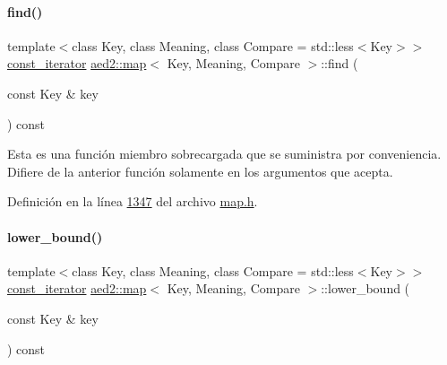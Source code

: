 \mbox{\label{classaed2_1_1map_adbf6f4ce01a16ca506e3c75fc2843882_adbf6f4ce01a16ca506e3c75fc2843882}} 
\paragraph{\texorpdfstring{find()}{find()}\hspace{0.1cm}{\footnotesize\ttfamily [2/2]}}
{\footnotesize\ttfamily template$<$class Key, class Meaning, class Compare = std\+::less$<$\+Key$>$$>$ \\
\hyperlink{classaed2_1_1map_1_1const__iterator}{const\+\_\+iterator} \hyperlink{classaed2_1_1map}{aed2\+::map}$<$ Key, Meaning, Compare $>$\+::find (\begin{DoxyParamCaption}\item[{const Key \&}]{key }\end{DoxyParamCaption}) const\hspace{0.3cm}{\ttfamily [inline]}}

Esta es una función miembro sobrecargada que se suministra por conveniencia. Difiere de la anterior función solamente en los argumentos que acepta. 

Definición en la línea \hyperlink{map_8h_source_l01347}{1347} del archivo \hyperlink{map_8h_source}{map.\+h}.

\mbox{\label{classaed2_1_1map_a62075a47afdf89267c5462f88164af3d_a62075a47afdf89267c5462f88164af3d}} 
\paragraph{\texorpdfstring{lower\+\_\+bound()}{lower\_bound()}\hspace{0.1cm}{\footnotesize\ttfamily [1/2]}}
{\footnotesize\ttfamily template$<$class Key, class Meaning, class Compare = std\+::less$<$\+Key$>$$>$ \\
\hyperlink{classaed2_1_1map_1_1const__iterator}{const\+\_\+iterator} \hyperlink{classaed2_1_1map}{aed2\+::map}$<$ Key, Meaning, Compare $>$\+::lower\+\_\+bound (\begin{DoxyParamCaption}\item[{const Key \&}]{key }\end{DoxyParamCaption}) const\hspace{0.3cm}{\ttfamily [inline]}}



